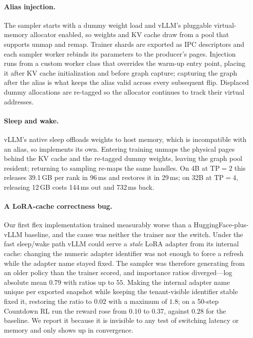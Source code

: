 \paragraph{Alias injection.} The sampler starts with a dummy weight load and vLLM's
pluggable virtual-memory allocator enabled, so weights and KV cache draw from a pool
that supports unmap and remap. Trainer shards are exported as IPC descriptors and each
sampler worker rebinds its parameters to the producer's pages. Injection runs from a
custom worker class that overrides the warm-up entry point, placing it after KV cache
initialization and before graph capture; capturing the graph after the alias is what
keeps the alias valid across every subsequent flip. Displaced dummy allocations are
re-tagged so the allocator continues to track their virtual addresses.

\paragraph{Sleep and wake.} vLLM's native sleep offloads weights to host memory, which
is incompatible with an alias, so \sysname implements its own. Entering training unmaps
the physical pages behind the KV cache and the re-tagged dummy weights, leaving the
graph pool resident; returning to sampling re-maps the same handles. On 4B at
$\text{TP}=2$ this releases 39.1\,GB per rank in 96\,ms and restores it in 29\,ms; on
32B at $\text{TP}=4$, releasing 12\,GB costs 144\,ms out and 732\,ms back.

\paragraph{A LoRA-cache correctness bug.} Our first flex implementation trained
measurably worse than a HuggingFace-plus-vLLM baseline, and the cause was neither the
trainer nor the switch. Under the fast sleep/wake path vLLM could serve a \emph{stale}
LoRA adapter from its internal cache: changing the numeric adapter identifier was not
enough to force a refresh while the adapter name stayed fixed. The sampler was
therefore generating from an older policy than the trainer scored, and importance
ratios diverged---log absolute mean $0.79$ with ratios up to $55$. Making the internal
adapter name unique per exported snapshot while keeping the tenant-visible identifier
stable fixed it, restoring the ratio to $0.02$ with a maximum of $1.8$; on a 50-step
Countdown RL run the reward rose from $0.10$ to $0.37$, against $0.28$ for the
baseline. We report it because it is invisible to any test of switching latency or
memory and only shows up in convergence.

